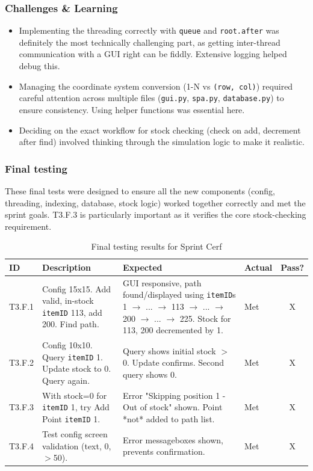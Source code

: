 \subsubsection{Challenges \& Learning}
\begin{itemize}
	\item Implementing the threading correctly with \verb|queue| and \verb|root.after| was definitely the most technically challenging part, as getting inter-thread communication with a GUI right can be fiddly. Extensive logging helped debug this.
	\item Managing the coordinate system conversion (1-N vs \verb|(row, col)|) required careful attention across multiple files (\verb|gui.py|, \verb|spa.py|, \verb|database.py|) to ensure consistency. Using helper functions was essential here.
	\item Deciding on the exact workflow for stock checking (check on add, decrement after find) involved thinking through the simulation logic to make it realistic.
\end{itemize}

\subsubsection{Final testing}
These final tests were designed to ensure all the new components (config, threading, indexing, database, stock logic) worked together correctly and met the sprint goals. T3.F.3 is particularly important as it verifies the core stock-checking requirement.

\begin{table}[htbp] %
	\centering
	\begin{tabularx}{\textwidth}{|l|X|p{4.5cm}|p{1.5cm}|c|}
		\hline
		\textbf{ID} & \textbf{Description} & \textbf{Expected} & \textbf{Actual} & \textbf{Pass?} \\
		\hline
		T3.F.1 & Config 15x15. Add valid, in-stock \verb|itemID| 113, add 200. Find path. & GUI responsive, path found/displayed using \verb|itemID|s 1 $ \rightarrow $ ... $ \rightarrow $ 113 $ \rightarrow $ ... $ \rightarrow $ 200 $ \rightarrow $ ... $ \rightarrow $ 225. Stock for 113, 200 decremented by 1. & Met & X \\
		\hline
		T3.F.2 & Config 10x10. Query \verb|itemID| 1. Update stock to 0. Query again. & Query shows initial stock $>$ 0. Update confirms. Second query shows 0. & Met & X \\
		\hline
		T3.F.3 & With stock=0 for \verb|itemID| 1, try Add Point \verb|itemID| 1. & Error "Skipping position 1 - Out of stock" shown. Point *not* added to path list. & Met & X \\
		\hline
		T3.F.4 & Test config screen validation (text, 0, $>$50). & Error messageboxes shown, prevents confirmation. & Met & X \\
		\hline
	\end{tabularx}
	\caption{Final testing results for Sprint Cerf}
\end{table}

